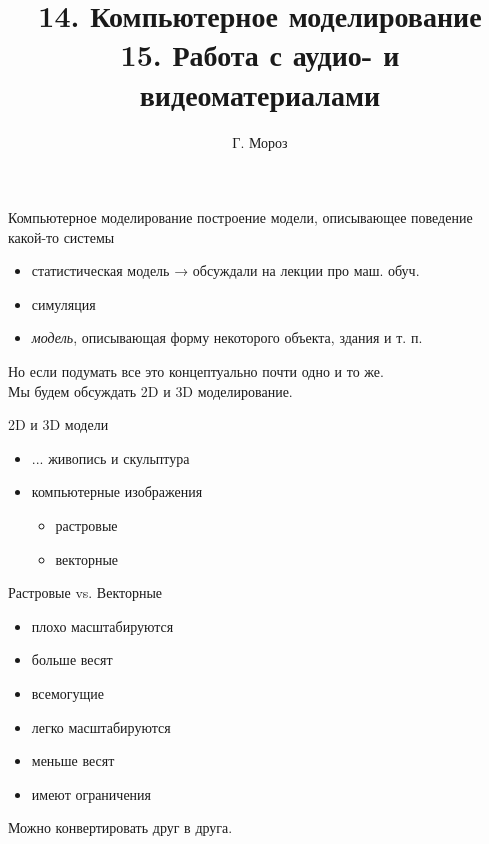 \documentclass[13pt, t]{beamer}
\title{\huge 
14. Компьютерное моделирование\\
15. Работа с аудио- и видеоматериалами 
}
\author[shortname]{Г. Мороз }
\date{\begin{center} 
\large 1 июня 2018 г.
\end{center}}
\begin{document}
\begin{frame}[plain]
\maketitle
\end{frame}


\begin{frame}{Компьютерное моделирование}
построение модели, описывающее поведение какой-то системы
\begin{itemize}
\item статистическая модель 
\hfill → обсуждали на лекции про маш. обуч.
\item симуляция
\item \textit{модель}, описывающая форму некоторого объекта, здания и т. п.
\end{itemize}
\vfill
\pause Но если подумать все это концептуально почти одно и то же.\\
Мы будем обсуждать 2D и 3D моделирование.
\end{frame}

\begin{frame}{2D и 3D модели}
\begin{itemize}
\item \pause ... живопись и скульптура \pause
\item компьютерные изображения
\begin{itemize}
\item растровые
\item векторные
\end{itemize}
\end{itemize}
\end{frame}

\begin{frame}{Растровые vs. Векторные}
\begin{multicols}{2}
\begin{itemize}
\item плохо масштабируются
\item больше весят
\item всемогущие
\end{itemize}
\columnbreak
\begin{itemize}
\item легко масштабируются
\item меньше весят
\item имеют ограничения
\end{itemize}
\end{multicols}
Можно конвертировать друг в друга.
\end{frame}
\end{document}
